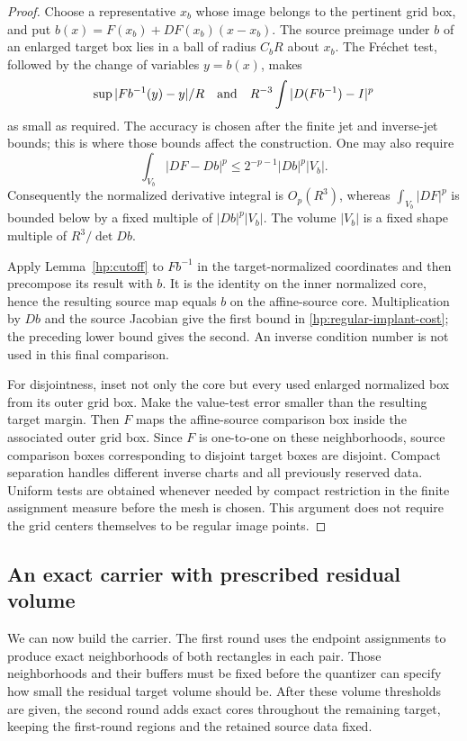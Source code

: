 \begin{proof}
Choose a representative $x_b$ whose image belongs to the pertinent
grid box, and put $b(x)=F(x_b)+DF(x_b)(x-x_b)$.  The source preimage
under $b$ of an enlarged target box lies in a ball of radius $C_bR$
about $x_b$.  The Fr\'echet test, followed by the change of variables
$y=b(x)$, makes
\[
 \sup |F b^{-1}(y)-y|/R
 \quad\hbox{and}\quad
 R^{-3}\int|D(F b^{-1})-I|^p
\]
as small as required.  The accuracy is chosen after the finite jet
and inverse-jet bounds; this is where those bounds affect the
construction.  One may also require
\[
 \int_{V_b}|DF-Db|^p
       \leq 2^{-p-1}|Db|^p |V_b|.
\]
Consequently the normalized derivative integral is $O_p(R^3)$,
whereas $\int_{V_b}|DF|^p$ is bounded below by a fixed multiple of
$|Db|^p|V_b|$.  The volume $|V_b|$ is a fixed shape multiple of
$R^3/\det Db$.

Apply Lemma~\ref{hp:cutoff} to $F b^{-1}$ in the target-normalized
coordinates and then precompose its result with $b$.  It is the
identity on the inner normalized core, hence the resulting source
map equals $b$ on the affine-source core.  Multiplication by $Db$
and the source Jacobian give the first bound in
\eqref{hp:regular-implant-cost}; the preceding lower bound gives
the second.  An inverse condition number is not used in this final
comparison.

For disjointness, inset not only the core but every used enlarged
normalized box from its outer grid box.  Make the value-test error
smaller than the resulting target margin.  Then $F$ maps the
affine-source comparison box inside the associated outer grid box.
Since $F$ is one-to-one on these neighborhoods, source comparison
boxes corresponding to disjoint target boxes are disjoint.  Compact
separation handles different inverse charts and all previously
reserved data.  Uniform tests are obtained whenever needed by
compact restriction in the finite assignment measure before the
mesh is chosen.  This argument does not require the grid centers
themselves to be regular image points.
\end{proof}

\subsection{An exact carrier with prescribed residual volume}

We can now build the carrier.  The first round uses the endpoint
assignments to produce exact neighborhoods of both rectangles in each
pair.  Those neighborhoods and their buffers must be fixed before the
quantizer can specify how small the residual target volume should be.
After these volume thresholds are given, the second round adds exact
cores throughout the remaining target, keeping the first-round regions
and the retained source data fixed.

